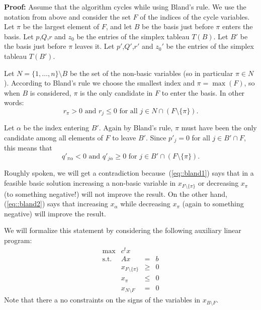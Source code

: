 \documentclass[12pt, showidx, twoside]{article}
\def\prove{\par \noindent \hbox{\bf Proof:}\quad}
\begin{document}
{{{\prove
Assume that the algorithm cycles while using Bland's rule.
We use the notation from above and consider the set $F$ of
the indices of the cycle variables. Let $\pi$ be the largest element
of $F$, and let $B$ be the basis just before $\pi$ enters the basis. 
Let $p$,$Q$,$r$ and $z_0$ be the entries of the simplex tableau $T(B)$.
Let $B'$ be the basis just before $\pi$ leaves it. %
Let $p'$,$Q'$,$r'$ and $z_0'$ be the entries of the simplex tableau $T(B')$.

Let $N = \{1,\dots,n\} \setminus B$ be the set of the 
non-basic variables (so in particular $\pi \in N$). %
According to Bland's rule we
choose the smallest index and $\pi = \max(F)$, so when $B$ is considered,
$\pi$ is the only candidate in $F$ to enter the basis. In other words:
\begin{equation}\label{eq::bland1}
    r_\pi > 0 \mbox{ and }r_j \leq 0 \mbox{ for all } j \in N \cap (F\setminus\{\pi\}).
\end{equation}

Let $\alpha$ be the index 
entering $B'$.
Again by Bland's rule, 
$\pi$ must have been the only
candidate among all elements of $F$ to leave $B'$. Since $p'_j=0$ for
all $j \in B' \cap F$, %
this means that
\begin{equation}\label{eq::bland2}
q'_{\pi \alpha} < 0 \mbox{ and }q'_{j \alpha} \geq 0 \mbox{ for } j \in B' \cap (F\setminus\{\pi\}).
\end{equation}

Roughly spoken, we will get a contradiction because~(\ref{eq::bland1}) says
that in a feasible basic solution
increasing a non-basic variable in $x_{F\setminus\{\pi\}}$ or decreasing
$x_\pi$ (to something negative!) will not improve the result. On the other hand,
(\ref{eq::bland2}) says that increasing $x_{\alpha}$ while decreasing 
$x_\pi$ (again to something negative) will improve the result.


We will formalize this statement by considering the following auxiliary linear program:
\begin{equation} \label{eq::auxLP}
   \begin{array}{rrcl}
   \mbox{max}   & c^tx                  &   & \\
   \mbox{s.t.\ } & Ax                    & =    & b\\
                & x_{F\setminus\{\pi\}} & \geq & 0\\
                & x_\pi             & \leq & 0\\
                & x_{N\setminus F}    &  = & 0
   \end{array}
\end{equation}
Note that there a no constraints on the signs of the variables
in $x_{B\setminus F}$.

}}}
\end{document}
